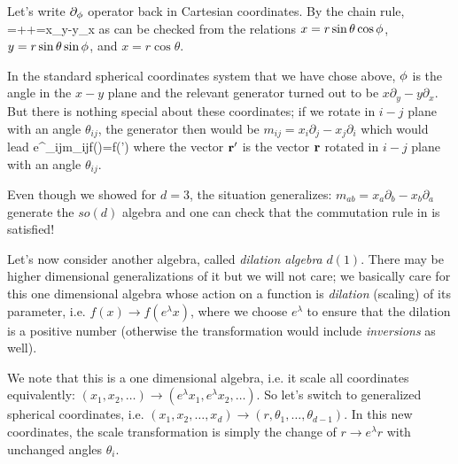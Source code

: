 \documentclass[12pt]{article}
\numberwithin{equation}{section}
\begin{document}
Let's write $\partial_\phi$ operator back in Cartesian coordinates. By the chain rule,
\be 
\frac{\partial}{\partial \f}=++=x\partial_y-y\partial_x
\ee 
as can be checked from the relations $x=r\sin\theta\cos\phi$, $y=r\sin\theta\sin\phi$, and $x=r\cos\theta$.

In the standard spherical coordinates system that we have chose above, $\phi$ is the angle in the $x-y$ plane and the relevant generator turned out to be $x\partial_y-y\partial_x$. But there is nothing special about these coordinates; if we rotate in $i-j$ plane with an angle $\theta_{ij}$, the generator then would be $m_{ij}=x_i\partial_j-x_j\partial_i$ which would lead
\be 
e^{\theta_{ij}m_{ij}}f(\br)=f(\br')
\ee 
where the vector $\mathbf{r}'$ is the vector $\mathbf{r}$ rotated in $i-j$ plane with an angle $\theta_{ij}$.

Even though we showed for $d=3$, the situation generalizes: $m_{ab}=x_a\partial_b-x_b\partial_a$ generate the $so(d)$ algebra and one can check that the commutation rule in  is satisfied!

Let's now consider another algebra, called \emph{dilation algebra} $d(1)$. There may be higher dimensional generalizations of it but we will not care; we basically care for this one dimensional algebra whose action on a function is \emph{dilation} (scaling) of its parameter, i.e. $f(x)\rightarrow f(e^\lambda x)$, where we choose $e^\lambda$ to ensure that the dilation is a positive number (otherwise the transformation would include \emph{inversions} as well).

We note that this is a one dimensional algebra, i.e. it scale all coordinates equivalently: $(x_1,x_2,\dots)\rightarrow(e^\lambda x_1,e^\lambda x_2,\dots)$. So let's switch to generalized spherical coordinates, i.e. $(x_1,x_2,\dots, x_d)\rightarrow (r,\theta_1,\dots,\theta_{d-1})$. In this new coordinates, the scale transformation is simply the change of $r\rightarrow e^\lambda r$ with unchanged angles $\theta_i$.
\end{document}
